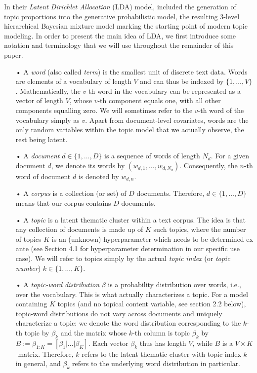 In their \textit{Latent Dirichlet Allocation} (LDA) model, \cite{blei2003latent} included the generation of topic proportions into the generative probabilistic model, the resulting 3-level hierarchical Bayesian mixture model marking the starting point of modern topic modeling. In order to present the main idea of LDA, we first introduce some notation and terminology that we will use throughout the remainder of this paper.

\begin{itemize}
\vspace{-0.25cm}
\item[•] A \textit{word} (also called \textit{term}) is the smallest unit of discrete text data. Words are elements of a vocabulary of length $V$ and can thus be indexed by $\{1,\dots,V\}$. Mathematically, the $v$-th word in the vocabulary can be represented as a vector of length $V$, whose $v$-th component equals one, with all other components equalling zero. We will sometimes refer to the $v$-th word of the vocabulary simply as $v$. Apart from document-level covariates, words are the only random variables within the topic model that we actually observe, the rest being latent.
\vspace{-0.25cm}
\item[•] A \textit{document} $d \in \{1,\dots,D\}$ is a sequence of words of length $N_{d}$. For a given document $d$, we denote its words by $(w_{d,1},\dots,w_{d,N_{d}})$. Consequently, the $n$-th word of document $d$ is denoted by $w_{d,n}$.
\vspace{-0.25cm}
\item[•] A \textit{corpus} is a collection (or set) of $D$ documents. Therefore, $d \in \{1,\dots,D\}$ means that our corpus contains $D$ documents.
\vspace{-0.25cm}
\item[•] A \textit{topic} is a latent thematic cluster within a text corpus. The idea is that any collection of documents is made up of $K$ such topics, where the number of topics $K$ is an (unknown) hyperparameter which needs to be determined ex ante (see Section 4.1 for hyperparameter determination in our specific use case). We will refer to topics simply by the actual \textit{topic index} (or \textit{topic number}) $k \in \{1,\dots,K\}$.
\vspace{-0.25cm}
\item[•] A \textit{topic-word distribution} $\beta$ is a probability distribution over words, i.e., over the vocabulary. This is what actually characterizes a topic. For a model containing $K$ topics (and no topical content variable, see section 2.2 below), topic-word distributions do not vary across documents and uniquely characterize a topic: we denote the word distribution corresponding to the $k$-th topic by $\beta_k$ and the matrix whose $k$-th column is topic $\beta_k$ by $B:=\beta_{1:K}=[\beta_1|\dots|\beta_K]$. Each vector $\beta_k$ thus has length $V$, while $B$ is a $V \times K$-matrix. Therefore, $k$ refers to the latent thematic cluster with topic index $k$ in general, and $\beta_k$ refers to the underlying word distribution in particular.

\end{itemize}
